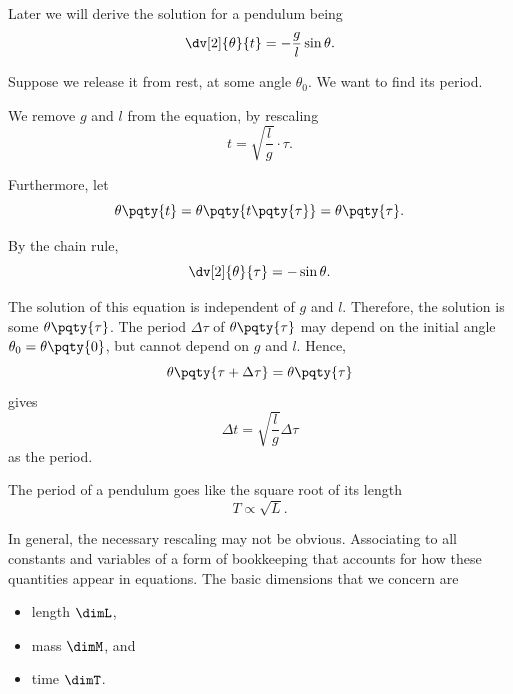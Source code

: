 \begin{example}
    \label{ex:dimensional-anslysis-pendulum}%
    Later we will derive the solution for a pendulum being
    \begin{equation}
        \dv[2]{\theta}{t} = - \frac{g}{l} \sin \theta.
    \end{equation}

    Suppose we release it from rest, at some angle \(\theta_0\). We want to find its period.

    We remove \(g\) and \(l\) from the equation, by rescaling
    \begin{equation}
        t = \sqrt{\frac{l}{g}} \cdot \tau.
    \end{equation}

    Furthermore, let
    \begin{equation}
        \theta\pqty{t} = \theta\pqty{t\pqty{\tau}} = \theta\pqty{\tau}.
    \end{equation}

    By the chain rule,
    \begin{equation}
        \dv[2]{\theta}{\tau} = - \sin \theta.
    \end{equation}

    The solution of this equation is independent of \(g\) and \(l\). Therefore, the solution is some \(\theta\pqty{\tau}\). The period \(\Delta \tau\) of \(\theta\pqty{\tau}\) may depend on the initial angle \(\theta_0 = \theta\pqty{0}\), but cannot depend on \(g\) and \(l\). Hence,
    \begin{equation}
        \theta\pqty{\tau + \Delta \tau} = \theta\pqty{\tau}
    \end{equation}
    gives
    \begin{equation}
        \Delta t = \sqrt{\frac{l}{g}} \Delta \tau
    \end{equation}
    as the period.

    The period of a pendulum goes like the square root of its length
    \begin{equation}
        T \propto \sqrt{L}.
    \end{equation}
\end{example}

In general, the necessary rescaling may not be obvious. Associating  to all constants and variables of a form of bookkeeping that accounts for how these quantities appear in equations. The basic dimensions that we concern are
\begin{itemize}
    \item length \(\dimL\),
    \item mass \(\dimM\), and
    \item time \(\dimT\).
\end{itemize}

